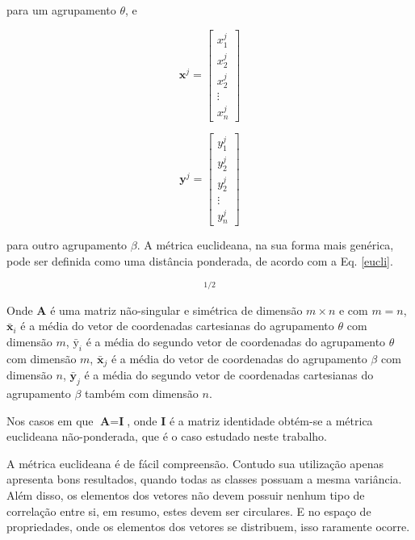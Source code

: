 para um agrupamento $\theta$, e 

\begin{multicols}{2}

\begin{equation}
     \textbf{x}^{j}=
		\begin{bmatrix} 
		x_{1}^{j} \\
		x_{2}^{j} \\
		x_{2}^{j} \\
		\vdots \\
		x_{n}^{j}
		\end{bmatrix}
\end{equation}

\begin{equation}
      \textbf{y}^{j}=
		\begin{bmatrix} 
		y_{1}^{j} \\
		y_{2}^{j} \\
		y_{2}^{j} \\
		\vdots \\
		y_{n}^{j}
		\end{bmatrix}
\end{equation}
\end{multicols}

para outro agrupamento  $\beta$.  A métrica euclideana, na sua forma mais genérica, pode ser definida como uma distância ponderada, de acordo com a Eq. \ref{eucli}.

\begin{equation}
[(\bar{\textbf{x}_{i}}-\bar{\textbf{x}}_{j})^{T}\textbf{A}(\bar{\textbf{y}}_{i}-\bar{\textbf{y}}_{j})]^{1/2}
\label{eucli}
\end{equation}

Onde $\textbf{A}$ é uma matriz não-singular e simétrica de dimensão $m \times n $ e com $m=n$, $\bar{\textbf{x}}_{i}$ é a média do vetor de coordenadas cartesianas do agrupamento $\theta$ com dimensão $m$, $\bar{\text{y}}_{i}$ é a média do segundo vetor de coordenadas do agrupamento $\theta$ com dimensão $m$, $\bar{\textbf{x}}_{j}$ é a média do vetor de coordenadas do agrupamento $\beta$ com dimensão $n$, $\bar{\textbf{y}}_{j}$ é a média do segundo vetor de coordenadas cartesianas do agrupamento $\beta$ também com dimensão $n$.

Nos casos em que $\textbf{A} = \textbf{I}$, onde $\textbf{I}$ é a matriz identidade obtém-se a métrica euclideana não-ponderada, que é o caso estudado neste trabalho. 

A métrica euclideana é de fácil compreensão. Contudo sua utilização apenas apresenta bons resultados, quando todas as classes possuam a mesma variância. Além disso, os elementos dos vetores não devem possuir nenhum tipo de correlação entre si, em resumo, estes devem ser circulares. E no espaço de propriedades, onde os elementos dos vetores se distribuem, isso raramente ocorre. 

